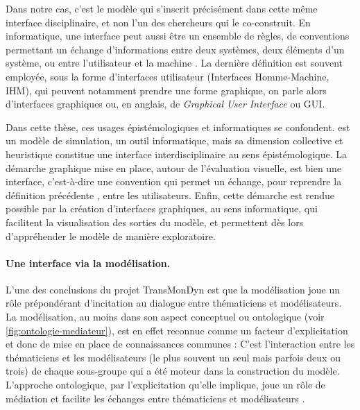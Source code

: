 Dans notre cas, c'est le modèle \simfeodal{} qui s'inscrit précisément dans cette même interface disciplinaire, et non l'un des chercheurs qui le co-construit.
En informatique, une interface peut aussi être un \og ensemble de règles, de conventions permettant un échange d’informations entre deux systèmes, deux éléments d’un système, ou entre l’utilisateur et la machine\fg{} \autocite{academie_francaise_interface_2019}.
La dernière définition est souvent employée, sous la forme \og d'interfaces utilisateur\fg{} (Interfaces Homme-Machine, IHM), qui peuvent notamment prendre une forme graphique, on parle alors d'interfaces graphiques ou, en anglais, de \og \textit{Graphical User Interface}\fg{} ou GUI.

Dans cette thèse, ces usages épistémologiques et informatiques se confondent.
\simfeodal{} est un modèle de simulation, un outil informatique, mais sa dimension collective et heuristique constitue une interface interdisciplinaire au sens épistémologique.
La démarche graphique mise en place, autour de l'évaluation visuelle, est bien une interface, c'est-à-dire une \og convention qui permet un échange\fg{}, pour reprendre la définition précédente \autocite{academie_francaise_interface_2019}, entre les utilisateurs.
Enfin, cette démarche est rendue possible par la création d'interfaces graphiques, au sens informatique, qui facilitent la visualisation des sorties du modèle, et permettent dès lors d'appréhender le modèle de manière exploratoire.


\paragraph{Une interface via la modélisation.}

L'une des conclusions du projet TransMonDyn est que la modélisation joue un rôle prépondérant d'incitation au dialogue entre thématiciens et modélisateurs.
La modélisation, au moins dans son aspect conceptuel ou ontologique (voir \cref{fig:ontologie-mediateur}), est en effet reconnue comme un facteur d'explicitation et donc de mise en place de connaissances communes :
\og C'est l'interaction entre les thématiciens et les modélisateurs (le plus souvent un seul mais parfois deux ou trois) de chaque sous-groupe qui a été moteur dans la construction du modèle.
\textelp{}
L'approche ontologique, par l'explicitation qu'elle implique, joue un rôle de médiation et facilite les échanges entre thématiciens et modélisateurs \fg{} \autocite[458]{sanders_points_2017}.

